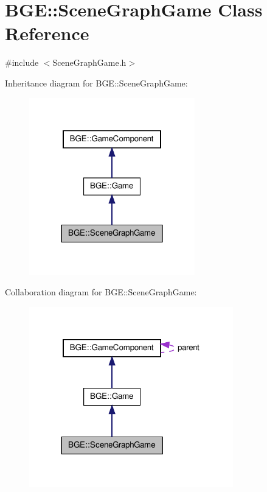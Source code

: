 \hypertarget{class_b_g_e_1_1_scene_graph_game}{\section{B\-G\-E\-:\-:Scene\-Graph\-Game Class Reference}
\label{class_b_g_e_1_1_scene_graph_game}
}


{\ttfamily \#include $<$Scene\-Graph\-Game.\-h$>$}



Inheritance diagram for B\-G\-E\-:\-:Scene\-Graph\-Game\-:
\nopagebreak
\begin{figure}[H]
\begin{center}
\leavevmode
\includegraphics[width=204pt]{class_b_g_e_1_1_scene_graph_game__inherit__graph}
\end{center}
\end{figure}


Collaboration diagram for B\-G\-E\-:\-:Scene\-Graph\-Game\-:
\nopagebreak
\begin{figure}[H]
\begin{center}
\leavevmode
\includegraphics[width=251pt]{class_b_g_e_1_1_scene_graph_game__coll__graph}
\end{center}
\end{figure}
